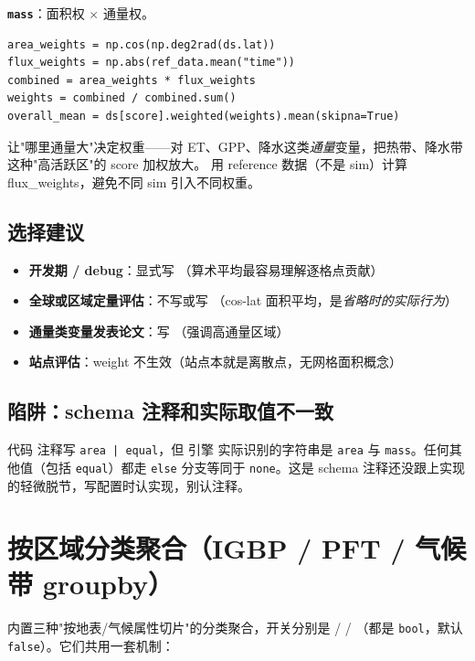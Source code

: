 \textbf{\texttt{mass}}：面积权 $\times$ 通量权。
\begin{verbatim}
area_weights = np.cos(np.deg2rad(ds.lat))
flux_weights = np.abs(ref_data.mean("time"))
combined = area_weights * flux_weights
weights = combined / combined.sum()
overall_mean = ds[score].weighted(weights).mean(skipna=True)
\end{verbatim}
让"哪里通量大"决定权重——对 ET、GPP、降水这类\emph{通量}变量，把热带、降水带这种"高活跃区"的 score 加权放大。\openbench{} 用 reference 数据（不是 sim）计算 flux\_weights，避免不同 sim 引入不同权重。

\subsection{选择建议}

\begin{itemize}
  \item \textbf{开发期 / debug}：显式写 （算术平均最容易理解逐格点贡献）
  \item \textbf{全球或区域定量评估}：不写或写 （cos-lat 面积平均，是\emph{省略时的实际行为}）
  \item \textbf{通量类变量发表论文}：写 （强调高通量区域）
  \item \textbf{站点评估}：weight 不生效（站点本就是离散点，无网格面积概念）
\end{itemize}

\subsection{陷阱：schema 注释和实际取值不一致}

代码  注释写 \texttt{area | equal}，但 \openbench{} 引擎  实际识别的字符串是 \texttt{area} 与 \texttt{mass}。任何其他值（包括 \texttt{equal}）都走 \texttt{else} 分支等同于 \texttt{none}。这是 schema 注释还没跟上实现的轻微脱节，写配置时认实现，别认注释。

\section{按区域分类聚合（IGBP / PFT / 气候带 groupby）}

\openbench{} 内置三种"按地表/气候属性切片"的分类聚合，开关分别是  /  / （都是 \texttt{bool}，默认 \texttt{false}）。它们共用一套机制：

